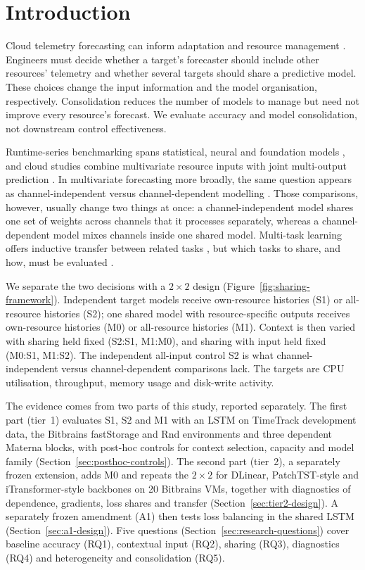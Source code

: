\documentclass[5p,twocolumn]{elsarticle}
\begin{document}
\section{Introduction}
\label{sec:introduction}

Cloud telemetry forecasting can inform adaptation and resource management
\citep{Taherizadeh2018Monitoring,Bauer2020SelfAware}. Engineers must decide
whether a target's forecaster should include other resources' telemetry and
whether several targets should share a predictive model. These choices change
the input information and the model organisation, respectively.
Consolidation reduces the number of models to manage but need not improve
every resource's forecast. We evaluate accuracy and model consolidation, not
downstream control effectiveness.

Runtime-series benchmarking spans statistical, neural and foundation models
\citep{DiMenna2026RuntimeForecasting}, and cloud studies combine multivariate
resource inputs with joint multi-output prediction
\citep{Ullah2023CloudBiLSTM,Tripathi2025MMRP}. In multivariate forecasting
more broadly, the same question appears as channel-independent versus
channel-dependent modelling \citep{Han2024ChannelIndependent}. Those
comparisons, however, usually change two things at once: a
channel-independent model shares one set of weights across channels that it
processes separately, whereas a channel-dependent model mixes channels inside
one shared model. Multi-task learning offers inductive transfer between
related tasks \citep{Caruana1997Multitask}, but which tasks to share, and
how, must be evaluated
\citep{Standley2020TaskGrouping,Fifty2021TaskGroupings,Nochumsohn2025MTLinear}.

We separate the two decisions with a $2\times2$ design
(Figure~\ref{fig:sharing-framework}). Independent target models receive
own-resource histories (S1) or all-resource histories (S2); one shared model
with resource-specific outputs receives own-resource histories (M0) or
all-resource histories (M1). Context is then varied with sharing held fixed
(S2:S1, M1:M0), and sharing with input held fixed (M0:S1, M1:S2). The
independent all-input control S2 is what channel-independent versus
channel-dependent comparisons lack. The targets are CPU utilisation,
throughput, memory usage and disk-write activity.

The evidence comes from two parts of this study, reported separately. The first
part (tier~1) evaluates S1, S2 and M1 with an LSTM on TimeTrack development data,
the Bitbrains fastStorage and Rnd environments and three dependent Materna
blocks, with post-hoc controls for context selection, capacity and model
family (Section~\ref{sec:posthoc-controls}). The second part (tier~2), a separately frozen extension, adds M0
and repeats the $2\times2$ for DLinear, PatchTST-style and iTransformer-style
backbones on 20 Bitbrains VMs, together with diagnostics of dependence,
gradients, loss shares and transfer (Section~\ref{sec:tier2-design}). A
separately frozen amendment (A1) then tests loss balancing in the shared
LSTM (Section~\ref{sec:a1-design}). Five
questions (Section~\ref{sec:research-questions}) cover baseline accuracy
(RQ1), contextual input (RQ2), sharing (RQ3), diagnostics (RQ4) and
heterogeneity and consolidation (RQ5).
\end{document}
